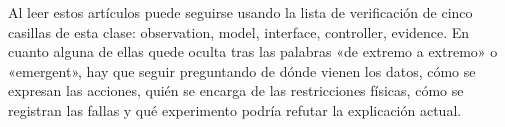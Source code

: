 Al leer estos artículos puede seguirse usando la lista de verificación de cinco casillas de esta clase: observation, model, interface, controller, evidence. En cuanto alguna de ellas quede oculta tras las palabras «de extremo a extremo» o «emergent», hay que seguir preguntando de dónde vienen los datos, cómo se expresan las acciones, quién se encarga de las restricciones físicas, cómo se registran las fallas y qué experimento podría refutar la explicación actual.


